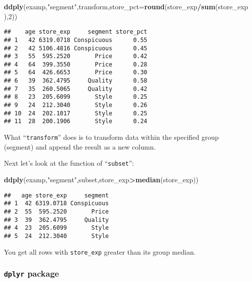 \documentclass[
]{article}
\newenvironment{Shaded}{\begin{snugshade}}{\end{snugshade}}
\newcommand{\DataTypeTok}[1]{\textcolor[rgb]{0.13,0.29,0.53}{#1}}
\newcommand{\DecValTok}[1]{\textcolor[rgb]{0.00,0.00,0.81}{#1}}
\newcommand{\KeywordTok}[1]{\textcolor[rgb]{0.13,0.29,0.53}{\textbf{#1}}}
\newcommand{\NormalTok}[1]{#1}
\newcommand{\OperatorTok}[1]{\textcolor[rgb]{0.81,0.36,0.00}{\textbf{#1}}}
\newcommand{\StringTok}[1]{\textcolor[rgb]{0.31,0.60,0.02}{#1}}
\begin{document}
\begin{Shaded}
\begin{Highlighting}[]
\KeywordTok{ddply}\NormalTok{(examp,}\StringTok{"segment"}\NormalTok{,transform,}\DataTypeTok{store_pct=}\KeywordTok{round}\NormalTok{(store_exp}\OperatorTok{/}\KeywordTok{sum}\NormalTok{(store_exp),}\DecValTok{2}\NormalTok{))}
\end{Highlighting}
\end{Shaded}

\begin{verbatim}
##    age store_exp     segment store_pct
## 1   42 6319.0718 Conspicuous      0.55
## 2   42 5106.4816 Conspicuous      0.45
## 3   55  595.2520       Price      0.42
## 4   64  399.3550       Price      0.28
## 5   64  426.6653       Price      0.30
## 6   39  362.4795     Quality      0.58
## 7   35  260.5065     Quality      0.42
## 8   23  205.6099       Style      0.25
## 9   24  212.3040       Style      0.26
## 10  24  202.1017       Style      0.25
## 11  28  200.1906       Style      0.24
\end{verbatim}

What ``\texttt{transform}'' does is to transform data within the
specified group (segment) and append the result as a new column.

Next let's look at the function of ``\texttt{subset}'':

\begin{Shaded}
\begin{Highlighting}[]
\KeywordTok{ddply}\NormalTok{(examp,}\StringTok{"segment"}\NormalTok{,subset,store_exp}\OperatorTok{>}\KeywordTok{median}\NormalTok{(store_exp))}
\end{Highlighting}
\end{Shaded}

\begin{verbatim}
##   age store_exp     segment
## 1  42 6319.0718 Conspicuous
## 2  55  595.2520       Price
## 3  39  362.4795     Quality
## 4  23  205.6099       Style
## 5  24  212.3040       Style
\end{verbatim}

You get all rows with \texttt{store\_exp} greater than its group median.

\hypertarget{dplyr-package}{%
\subsubsection{\texorpdfstring{\texttt{dplyr}
package}{dplyr package}}\label{dplyr-package}}
\end{document}
